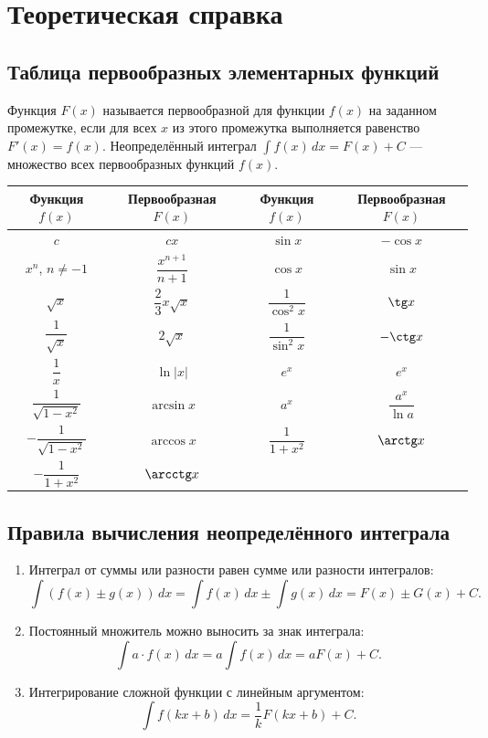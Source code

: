 \section*{Теоретическая справка}
\subsection*{Таблица первообразных элементарных функций}
Функция $F(x)$ называется первообразной для функции $f(x)$ на заданном промежутке, если для всех $x$ из этого промежутка выполняется равенство $F'(x)=f(x)$. Неопределённый интеграл $\int f(x)\,dx=F(x)+C$ --- множество всех первообразных функций $f(x)$.

\begin{center}
\renewcommand{\arraystretch}{1.35}
\begin{tabular}{c|c@{\qquad}c|c}
Функция $f(x)$ & Первообразная $F(x)$ & Функция $f(x)$ & Первообразная $F(x)$ \\ \hline
$c$ & $cx$ & $\sin x$ & $-\cos x$ \\
$x^n$, $n\ne-1$ & $\dfrac{x^{n+1}}{n+1}$ & $\cos x$ & $\sin x$ \\
$\sqrt{x}$ & $\dfrac23x\sqrt{x}$ & $\dfrac1{\cos^2x}$ & $\tg x$ \\
$\dfrac1{\sqrt{x}}$ & $2\sqrt{x}$ & $\dfrac1{\sin^2x}$ & $-\ctg x$ \\
$\dfrac1x$ & $\ln|x|$ & $e^x$ & $e^x$ \\
$\dfrac1{\sqrt{1-x^2}}$ & $\arcsin x$ & $a^x$ & $\dfrac{a^x}{\ln a}$ \\
$-\dfrac1{\sqrt{1-x^2}}$ & $\arccos x$ & $\dfrac1{1+x^2}$ & $\arctg x$ \\
$-\dfrac1{1+x^2}$ & $\arcctg x$ & &
\end{tabular}
\end{center}

\subsection*{Правила вычисления неопределённого интеграла}
\begin{enumerate}
  \item Интеграл от суммы или разности равен сумме или разности интегралов:
  \[\int(f(x)\pm g(x))\,dx=\int f(x)\,dx\pm\int g(x)\,dx=F(x)\pm G(x)+C.\]
  \item Постоянный множитель можно выносить за знак интеграла:
  \[\int a\cdot f(x)\,dx=a\int f(x)\,dx=aF(x)+C.\]
  \item Интегрирование сложной функции с линейным аргументом:
  \[\int f(kx+b)\,dx=\frac1kF(kx+b)+C.\]
\end{enumerate}

